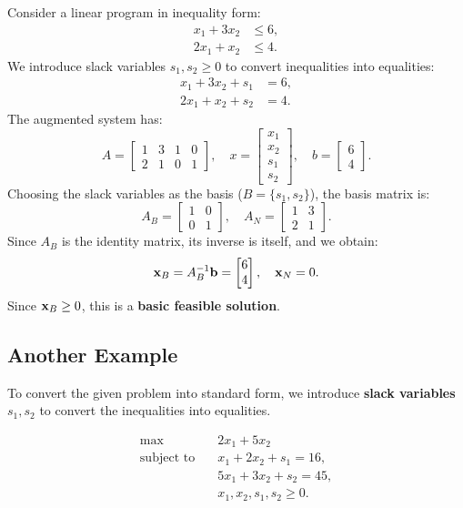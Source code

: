 Consider a linear program in inequality form:
\[
\begin{aligned}
    x_1 + 3x_2 &\leq 6, \\
    2x_1 + x_2 &\leq 4.
\end{aligned}
\]
We introduce slack variables \( s_1, s_2 \geq 0 \) to convert inequalities into equalities:
\[
\begin{aligned}
    x_1 + 3x_2 + s_1 &= 6, \\
    2x_1 + x_2 + s_2 &= 4.
\end{aligned}
\]
The augmented system has:
\[
A =
\begin{bmatrix}
    1 & 3 & 1 & 0 \\
    2 & 1 & 0 & 1
\end{bmatrix}, \quad
x =
\begin{bmatrix}
    x_1 \\ x_2 \\ s_1 \\ s_2
\end{bmatrix}, \quad
b =
\begin{bmatrix}
    6 \\ 4
\end{bmatrix}.
\]
Choosing the slack variables as the basis (\(B= \{s_1, s_2\} \)), the basis matrix is:
\[
A_B =
\begin{bmatrix}
    1 & 0 \\
    0 & 1
\end{bmatrix}, \quad A_N =
\begin{bmatrix}
    1 & 3 \\
    2 & 1
\end{bmatrix}.
\]
Since \( A_B \) is the identity matrix, its inverse is itself, and we obtain:
\[
\mathbf{x}_B = A_B^{-1}\mathbf{b}= 
\begin{bmatrix}
    6 \\ 4
\end{bmatrix}, \quad \mathbf{x}_N = 0.
\]
Since \( \mathbf{x}_B \geq 0 \), this is a \textbf{basic feasible solution}.


\subsection{Another Example}

To convert the given problem into standard form, we introduce \textbf{slack variables} \( s_1, s_2 \) to convert the inequalities into equalities.

\[
\begin{aligned}
    \max \quad & 2 x_1 + 5 x_2 \\
    \text{subject to} \quad 
    & x_1 + 2x_2 + s_1 = 16, \\
    & 5x_1 + 3x_2 + s_2 = 45, \\
    & x_1, x_2, s_1, s_2 \geq 0.
\end{aligned}
\]

